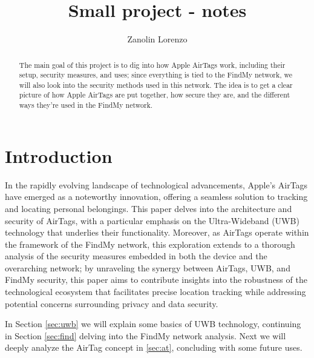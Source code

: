\documentclass[english]{article}
\title{Small project - notes}
\author{Zanolin Lorenzo}
\begin{document}
\maketitle

\tableofcontents
\newpage


\begin{abstract}
  The main goal of this project is to dig into how Apple AirTags work, including their setup, security measures, and uses; since everything is tied to the FindMy network, we will also look into the security methods used in this network. The idea is to get a clear picture of how Apple AirTags are put together, how secure they are, and the different ways they're used in the FindMy network.
\end{abstract}

\section{Introduction}
In the rapidly evolving landscape of technological advancements, Apple's AirTags have emerged as a noteworthy innovation, offering a seamless solution to tracking and locating personal belongings. This paper delves into the architecture and security of AirTags, with a particular emphasis on the Ultra-Wideband (UWB) technology that underlies their functionality. Moreover, as AirTags operate within the framework of the FindMy network, this exploration extends to a thorough analysis of the security measures embedded in both the device and the overarching network; by unraveling the synergy between AirTags, UWB, and FindMy security, this paper aims to contribute insights into the robustness of the technological ecosystem that facilitates precise location tracking while addressing potential concerns surrounding privacy and data security.

In Section \ref{sec:uwb} we will explain some basics of UWB technology, continuing in Section \ref{sec:find} delving into the FindMy network analysis. Next we will deeply analyze the AirTag concept in \ref{sec:at}, concluding with some future uses.
\end{document}
